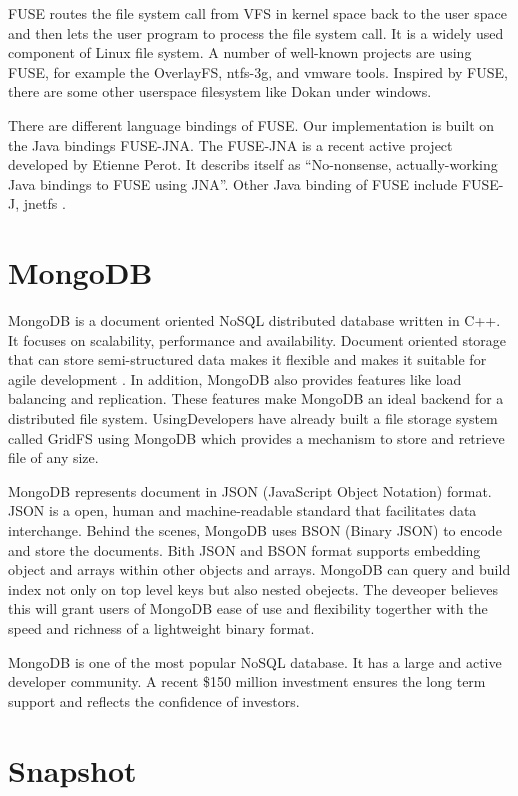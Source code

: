     FUSE routes the file system call from VFS in kernel space back to the user space and then lets the user program to process the file system call. It is a widely used component of Linux file system. A number of well-known projects are using FUSE, for example the OverlayFS, ntfs-3g, and vmware tools. Inspired by FUSE, there are some other userspace filesystem like Dokan under windows.

    There are different language bindings of FUSE. Our implementation is built on the Java bindings FUSE-JNA. The FUSE-JNA is a recent active project developed by Etienne Perot. It describs itself as ``No-nonsense, actually-working Java bindings to FUSE using JNA''. \cite{fusejna} Other Java binding of FUSE include FUSE-J, jnetfs .

\section{MongoDB}

    MongoDB is a document oriented NoSQL distributed database written in C++.\cite{mongodb} It focuses on scalability, performance and availability.\cite{mongo_overview} Document oriented storage that can store semi-structured data makes it flexible and makes it suitable for agile development \cite{docdb}. In addition, MongoDB also provides features like load balancing and replication. These features make MongoDB an ideal backend for a distributed file system. UsingDevelopers have already built a file storage system called GridFS using MongoDB which provides a mechanism to store and retrieve file of any size.\cite{gridfs}

    MongoDB represents document in JSON (JavaScript Object Notation) format. JSON is a open, human and machine-readable standard that facilitates data interchange. Behind the scenes, MongoDB uses BSON (Binary JSON) to encode and store the documents. Bith JSON and BSON format supports embedding object and arrays within other objects and arrays. MongoDB can query and build index not only on top level keys but also nested obejects. The deveoper believes this will grant users of MongoDB ease of use and flexibility togerther with the speed and richness of a lightweight binary format.\cite{bson}

    MongoDB is one of the most popular NoSQL database. It has a large and active developer community. A recent \$150 million investment ensures the long term support and reflects the confidence of investors.

\section{Snapshot}

